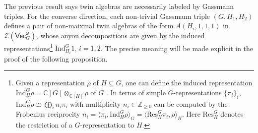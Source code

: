 \documentclass[aps,twocolumn,prx,floatfix,preprintnumbers, nofootinbib,10pt]{revtex4-2}
\numberwithin{equation}{section}
\theoremstyle{definition}
\newcommand{\Z}{{\mathbb Z}}
\newcommand{\bC}{{\mathbb C}}
\newcommand{\cZ}{\mathcal{Z}}
\renewcommand{\Vec}{\mathsf{Vec}}
\begin{document}
{The previous result says twin algebras are necessarily labeled by Gassmann triples. For the converse direction,} each non-trivial Gassmann triple $(G, H_1, H_2)$ defines a pair of non-maixmal twin algebras of the form $A(H_i,1,1,1)$ in $\cZ(\Vec_G^\omega)$, whose anyon decompositions are given by the induced representations\footnote{Given a representation $\rho$ of $H\subseteq G$, one can define the induced representation $\text{Ind}^G_H \rho = \bC[G]\otimes_{\bC[H]}\rho$ of $G$ \cite{serre_linear_1977}. In terms of simple $G$-representations $\{\pi_i\}_i$, $\text{Ind}^G_H \rho \cong \bigoplus_{i}n_i \pi_i$ with multiplicity $n_i\in \Z_{\geq 0}$ can be computed by the Frobenius reciprocity $n_i = \langle \pi_i, \text{Ind}^G_H \rho\rangle_G = \langle\text{Res}^G_H \pi_i, \rho\rangle_H$. Here $\text{Res}^G_H $ denotes the restriction of a $G$-representation to $H$.} $\text{Ind}^G_{H_i}1$, $i=1,2$. The precise meaning will be made explicit in the proof of the following proposition.


 
\end{document}
